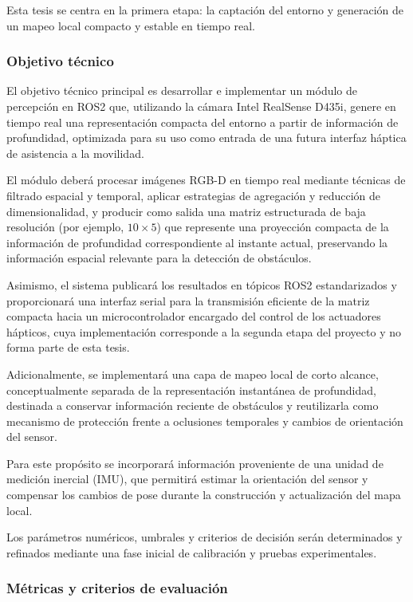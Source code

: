 Esta tesis se centra en la primera etapa: la captación del entorno y generación de un mapeo local compacto y estable en tiempo real.

\subsubsection{Objetivo técnico}

El objetivo técnico principal es desarrollar e implementar un módulo de percepción en ROS2 que, utilizando la cámara Intel
RealSense D435i, genere en tiempo real una representación compacta del entorno a partir de información de profundidad,
optimizada para su uso como entrada de una futura interfaz háptica de asistencia a la movilidad.

El módulo deberá procesar imágenes RGB-D en tiempo real mediante técnicas de filtrado espacial y temporal, aplicar estrategias
de agregación y reducción de dimensionalidad, y producir como salida una matriz estructurada de baja resolución (por ejemplo,
\(10 \times 5\)) que represente una proyección compacta de la información de profundidad correspondiente al instante actual,
preservando la información espacial relevante para la detección de obstáculos.

Asimismo, el sistema publicará los resultados en tópicos ROS2 estandarizados y proporcionará una interfaz serial para la
transmisión eficiente de la matriz compacta hacia un microcontrolador encargado del control de los actuadores hápticos,
cuya implementación corresponde a la segunda etapa del proyecto y no forma parte de esta tesis.

Adicionalmente, se implementará una capa de mapeo local de corto alcance, conceptualmente separada de la representación
instantánea de profundidad, destinada a conservar información reciente de obstáculos y reutilizarla como mecanismo
de protección frente a oclusiones temporales y cambios de orientación del sensor.

Para este propósito se incorporará información proveniente de una unidad de medición inercial (IMU), que permitirá estimar la
orientación del sensor y compensar los cambios de pose durante la construcción y actualización del mapa local.

Los parámetros numéricos, umbrales y criterios de decisión serán determinados y refinados mediante una fase inicial de calibración
y pruebas experimentales.

\subsubsection{Métricas y criterios de evaluación}

